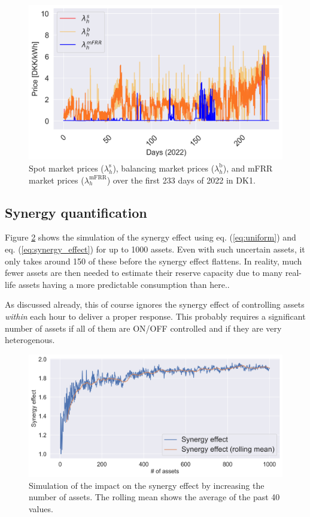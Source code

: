 \documentclass[conference]{IEEEtran}
\begin{document}
\begin{figure}[b]
    \centering
    \includegraphics[width=\columnwidth]{figures/prices.png}
    \caption{Spot market prices ($\lambda^{\text{s}}_h$), balancing market prices ($\lambda^{\text{b}}_h$), and mFRR market prices ($\lambda^{\text{mFRR}}_h$)  over the first 233 days of 2022 in DK1.}
    \label{fig:prices}
\end{figure}



\subsection{Synergy quantification}

Figure \ref{fig:synergy_effect} shows the simulation of the synergy effect using eq. (\ref{eq:uniform}) and
eq. (\ref{eq:synergy_effect}) for up to 1000 assets. Even with such uncertain assets, it only takes around 150 of these before the synergy effect flattens. In reality, much fewer assets are then needed to estimate their reserve capacity due to many real-life assets having a more predictable consumption than here..

As discussed already, this of course ignores the synergy effect of controlling assets \textit{within} each hour to deliver a proper response. This probably requires a significant number of assets if all of them are ON/OFF controlled and if they are very heterogenous.

\begin{figure}[t]
    \centering
    \includegraphics[width=\columnwidth]{figures/synergy_effect.png}
    \caption{Simulation of the impact on the synergy effect by increasing the number of assets. The rolling mean shows the average of the past 40 values.}
    \label{fig:synergy_effect}
\end{figure}
\end{document}
